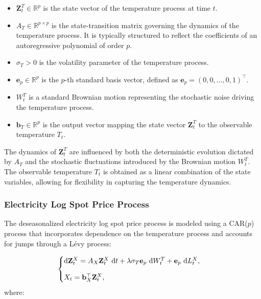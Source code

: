 \documentclass[10pt,a4paper,reqno]{amsart}
\theoremstyle{example}
\newcommand*\D{\mathop{}\!\textnormal{d}}
\begin{document}
\begin{itemize}
    \item $\mathbf{Z}_t^T \in \mathbb{R}^p$ is the state vector of the temperature process at time $t$.
    \item $A_T \in \mathbb{R}^{p \times p}$ is the state-transition matrix governing the dynamics of the temperature process. It is typically structured to reflect the coefficients of an autoregressive polynomial of order $p$.
    \item $\sigma_T > 0$ is the volatility parameter of the temperature process.
    \item $\mathbf{e}_p \in \mathbb{R}^p$ is the $p$-th standard basis vector, defined as $\mathbf{e}_p = (0, 0, \dots, 0, 1)^\top$.
    \item $W_t^T$ is a standard Brownian motion representing the stochastic noise driving the temperature process.
    \item $\mathbf{b}_T \in \mathbb{R}^p$ is the output vector mapping the state vector $\mathbf{Z}_t^T$ to the observable temperature $T_t$.
\end{itemize}

The dynamics of $\mathbf{Z}_t^T$ are influenced by both the deterministic evolution dictated by $A_T$ and the stochastic fluctuations introduced by the Brownian motion $W_t^T$. The observable temperature $T_t$ is obtained as a linear combination of the state variables, allowing for flexibility in capturing the temperature dynamics.

\subsubsection{Electricity Log Spot Price Process}

The deseasonalized electricity log spot price process is modeled using a CAR($p$) process that incorporates dependence on the temperature process and accounts for jumps through a L\'evy process:

\begin{align}
\begin{cases}
\D \mathbf{Z}_t^X = A_X \mathbf{Z}_t^X \, \D t + \lambda \sigma_T \mathbf{e}_p \, \D W_t^T + \mathbf{e}_p \, \D L_t^X, \\[2ex]
X_t = \mathbf{b}_X^\top \mathbf{Z}_t^X,
\end{cases} \label{eq:electricity-process}
\end{align}
where:
\end{document}
